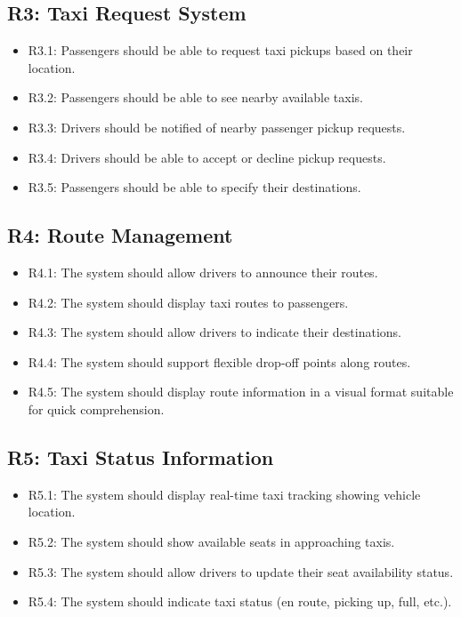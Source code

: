 \documentclass[a4paper,12pt]{article}
\begin{document}
\subsection*{R3: Taxi Request System}
\begin{itemize}
    \item R3.1: Passengers should be able to request taxi pickups based on their location.
    \item R3.2: Passengers should be able to see nearby available taxis.
    \item R3.3: Drivers should be notified of nearby passenger pickup requests.
    \item R3.4: Drivers should be able to accept or decline pickup requests.
    \item R3.5: Passengers should be able to specify their destinations.
\end{itemize}

\subsection*{R4: Route Management}
\begin{itemize}
    \item R4.1: The system should allow drivers to announce their routes.
    \item R4.2: The system should display taxi routes to passengers.
    \item R4.3: The system should allow drivers to indicate their destinations.
    \item R4.4: The system should support flexible drop-off points along routes.
    \item R4.5: The system should display route information in a visual format suitable for quick comprehension.
\end{itemize}

\subsection*{R5: Taxi Status Information}
\begin{itemize}
    \item R5.1: The system should display real-time taxi tracking showing vehicle location.
    \item R5.2: The system should show available seats in approaching taxis.
    \item R5.3: The system should allow drivers to update their seat availability status.
    \item R5.4: The system should indicate taxi status (en route, picking up, full, etc.).
\end{itemize}
\end{document}
